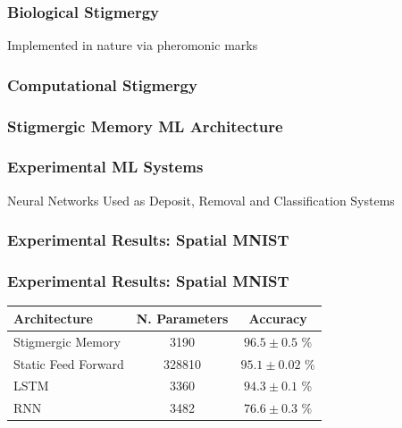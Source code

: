\documentclass{beamer}
\begin{document}
\begin{frame}
    \frametitle{Biological Stigmergy}
    \begin{center}
        Implemented in nature via pheromonic marks 
    \end{center}
    \pause
    
\end{frame}

\begin{frame}
    \frametitle{Computational Stigmergy}
    
\end{frame}

\begin{frame}
    \frametitle{Stigmergic Memory ML Architecture}
    
\end{frame}

\begin{frame}
    \frametitle{Experimental ML Systems}
    Neural Networks Used as Deposit, Removal and Classification Systems
    \vspace{1.5cm}
    
\end{frame}

\begin{frame}
    \frametitle{Experimental Results: Spatial MNIST}
    
\end{frame}

\begin{frame}
    \frametitle{Experimental Results: Spatial MNIST}
    \begin{table}
        \begin{tabular}{l | c | c}
            Architecture & N. Parameters & Accuracy \\
            \hline
            Stigmergic Memory & 3190 & $96.5 \pm 0.5$ \% \\
            Static Feed Forward & 328810 & $95.1 \pm 0.02$ \% \\
            LSTM & 3360 & $94.3 \pm 0.1$ \% \\
            RNN & 3482 & $76.6 \pm 0.3$ \% \\
        \end{tabular}
    \end{table}
\end{frame}
\end{document}
